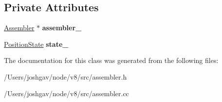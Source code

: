 \subsection*{Private Attributes}
\begin{DoxyCompactItemize}
\item 
\hyperlink{classv8_1_1internal_1_1_assembler}{Assembler} $\ast$ {\bfseries assembler\+\_\+}\hypertarget{classv8_1_1internal_1_1_assembler_positions_recorder_a465363c40ca823943b4db05ba1b94381}{}\label{classv8_1_1internal_1_1_assembler_positions_recorder_a465363c40ca823943b4db05ba1b94381}

\item 
\hyperlink{structv8_1_1internal_1_1_position_state}{Position\+State} {\bfseries state\+\_\+}\hypertarget{classv8_1_1internal_1_1_assembler_positions_recorder_a5a68fad818ef5e094e4bd7ce4bd0bd70}{}\label{classv8_1_1internal_1_1_assembler_positions_recorder_a5a68fad818ef5e094e4bd7ce4bd0bd70}

\end{DoxyCompactItemize}


The documentation for this class was generated from the following files\+:\begin{DoxyCompactItemize}
\item 
/\+Users/joshgav/node/v8/src/assembler.\+h\item 
/\+Users/joshgav/node/v8/src/assembler.\+cc\end{DoxyCompactItemize}
